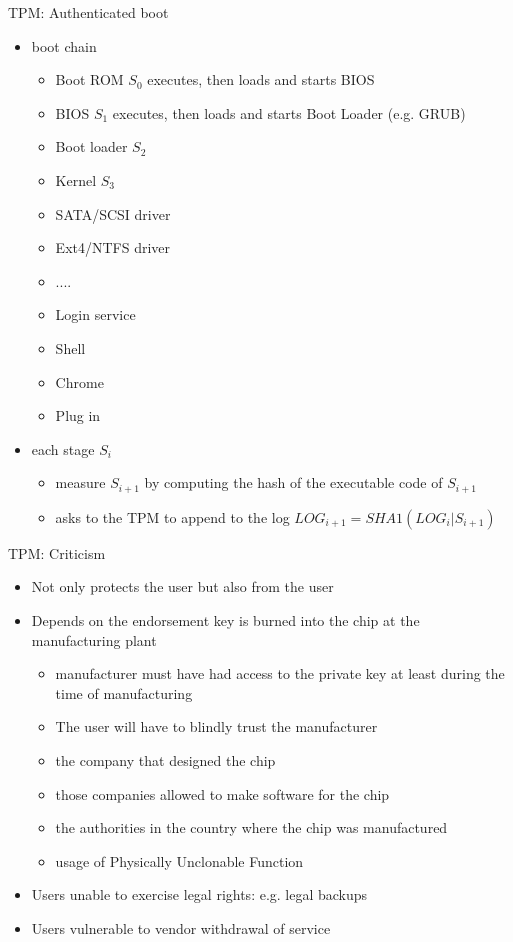 \documentclass{beamer}
\begin{document}
\begin{frame}{TPM: Authenticated boot}
  \begin{itemize}
  \item boot chain
    \begin{itemize}
      \item Boot ROM $S_0$ executes, then loads and starts BIOS
      \item BIOS $S_1$ executes, then loads and starts Boot Loader
        (e.g. GRUB)
      \item Boot loader $S_2$
      \item Kernel $S_3$
      \item SATA/SCSI driver
      \item Ext4/NTFS driver
      \item ....
      \item Login service
      \item Shell
      \item Chrome
      \item Plug in
    \end{itemize}
   \item each stage $S_i$
     
     \begin{itemize}
       \item measure $S_{i+1}$ by computing the hash of the executable
         code of $S_{i+1}$
       \item asks to the TPM to append to the log $LOG_{i+1} =
         SHA1(LOG_{i} | S_{i+1})$
     \end{itemize}
  \end{itemize}
\end{frame}

\begin{frame}{TPM: Criticism}
  \begin{itemize}
    \item Not only protects the user but also from the user
    \item Depends on the endorsement key is burned into the
      chip at the manufacturing plant
      
      \begin{itemize}
      \item manufacturer must have had access to the private key at least
        during the time of manufacturing
      \item The user
        will have to blindly trust the manufacturer
      \item  the company that
        designed the chip
      \item those companies allowed to make software
        for the chip
      \item the authorities
      in the country where the chip was manufactured
      \item usage of Physically Unclonable Function
      \end{itemize}
      
    \item Users unable to exercise legal rights: e.g. legal backups
    \item Users vulnerable to vendor withdrawal of service
  \end{itemize}
\end{frame}
\end{document}

